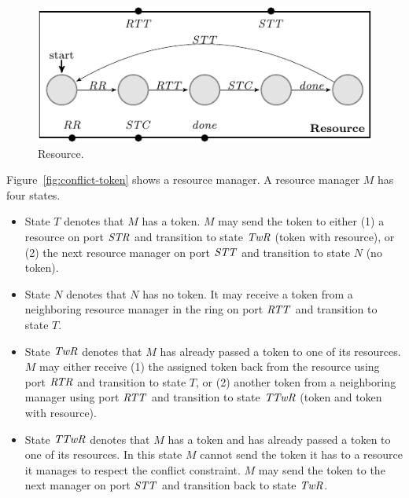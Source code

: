 \begin{figure}[H]
\begin{center}
\includegraphics[scale=1.2]{compiledfigures/resource-crop.pdf}
\caption{Resource.}
\label{fig:resource}
\end{center}
\end{figure}

Figure~\ref{fig:conflict-token} shows a resource manager.
A resource manager $M$ has four states. 
\begin{itemize}
  \item State $T$ denotes that $M$ has a token. $M$ may send the token to either 
    (1) a resource on port $\mathit{STR}$ and transition to state $\mathit{TwR}$ (token with resource), or 
    (2) the next resource manager on port $\mathit{STT}$ and transition to state $N$ (no token).
  \item State $N$ denotes that $N$ has no token. 
    It may receive a token from a neighboring resource manager in the ring on port $\mathit{RTT}$ 
    and transition to state $T$. 
  \item State $\mathit{TwR}$ denotes that $M$ has already passed a token to one of its resources. 
    $M$ may either receive (1) the assigned token back from the resource using port $\mathit{RTR}$ and transition to state $T$, 
    or (2) another token from a neighboring manager using port $\mathit{RTT}$ and transition to state $\mathit{TTwR}$ (token and token with resource).
  \item State $\mathit{TTwR}$ denotes that $M$ has a token and has already passed a token to one of its resources. 
    In this state $M$ cannot send the token it has to a resource it manages to respect the conflict constraint. 
    $M$ may send the token to the next manager on port $\mathit{STT}$ and transition back to state $\mathit{TwR}$. 
\end{itemize}

